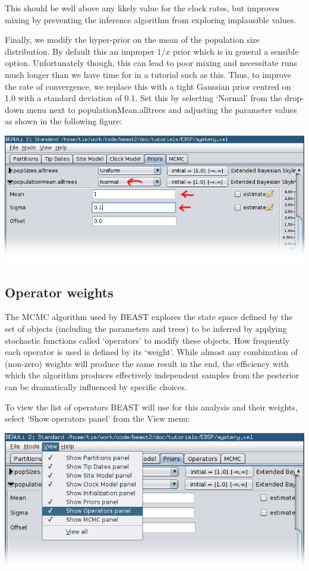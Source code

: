 \documentclass[a4paper,11pt]{article}
\begin{document}
This should be well above any likely value for the
clock rates, but improves mixing by preventing the inference algorithm from
exploring implausible values.

Finally, we modify the hyper-prior on the mean of the population size
distribution. By default this an improper $1/x$ prior which is in general a
sensible option. Unfortunately though, this can lead to poor mixing and
necessitate runs much longer than we have time for in a tutorial such as this.
Thus, to improve the rate of convergence, we replace this with a tight Gaussian
prior centred on 1.0 with a standard deviation of 0.1. Set this by selecting
`Normal' from the drop-down menu next to populationMean.alltrees and adjusting
the parameter values as shown in the following figure:

\includegraphics[width=\textwidth]{figures/popmean.png}

\subsection{Operator weights}

The MCMC algorithm used by BEAST explores the state space defined by the set of
objects (including the parameters and trees) to be inferred by applying
stochastic functions called `operators' to modify these objects. How frequently
each operator is used is defined by its `weight'. While almost any combination of (non-zero) weights will produce the same result in the end, the efficiency with which the algorithm produces effectively independent samples from the posterior can be dramatically influenced by specific choices.

To view the list of operators BEAST will use for this analysis and their
weights, select `Show operators panel' from the View menu:

\includegraphics[width=\textwidth]{figures/view_operators.png}
\end{document}
